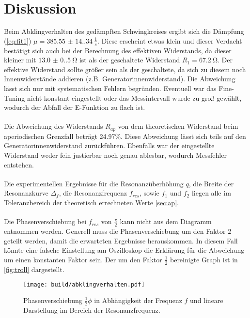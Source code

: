 \section{Diskussion}
\label{sec:Diskussion}
Beim Abklingverhalten des gedämpften Schwingkreises ergibt sich die Dämpfung (\autoref{eq:fit1}) 
$\mu = \SI{385.55(14.34)}{\frac{1}{s}}$. Diese erscheint etwas klein und dieser Verdacht
bestätigt sich auch bei der Berechnung des effektiven Widerstands, da dieser kleiner mit
$\SI{13.0(0.5)}{\ohm}$ ist als der geschaltete Widerstand $R_1 = \SI{67.2}{\ohm}$.
Der effektive Widerstand sollte größer sein als der geschaltete, da sich zu diesem noch
Innenwiderstände addieren (z.B. Generatorinnenwiderstand). Die Abweichung lässt sich nur mit
systematischen Fehlern begründen. Eventuell war das Fine-Tuning nicht konstant eingestellt
oder das Messintervall wurde zu groß gewählt, wodurch der Abfall der E-Funktion zu flach ist.
\\
\\
Die Abweichung des Widerstands $R_{ap}$ von dem theoretischen Widerstand beim aperiodischen
Grenzfall beträgt 24.97\%. Diese Abweichung lässt sich teils auf den Generatorinnenwiderstand
zurückführen. Ebenfalls war der eingestellte Widerstand weder fein justierbar noch genau ablesbar, 
wodurch Messfehler entstehen.
\\
\\
Die experimentellen Ergebnisse für die Resonanzüberhöhung $q$, die Breite der Resonanzkurve 
$\Delta_f$, die Resonanzfrequenz $f_{res}$, sowie $f_1$ und $f_2$ liegen alle im Toleranzbereich
der theoretisch errechneten Werte \autoref{sec:ap}.
\\
\\
Die Phasenverschiebung bei $f_{res}$ von $\frac{\pi}{2}$ kann nicht aus dem Diagramm entnommen werden.
Generell muss die Phasenverschiebung um den Faktor 2 geteilt werden, damit die erwarteten 
Ergebnisse herauskommen. In diesem Fall könnte eine falsche Einstellung am Oszilloskop
die Erklärung für die Abweichung um einen konstanten Faktor sein.
Der um den Faktor $\frac{1}{2}$ bereinigte Graph ist in \autoref{fig:troll} dargestellt.
\begin{figure}[H]
    \texttt{[image: build/abklingverhalten.pdf]}
    \caption{Phasenverschiebung $\frac{1}{2}\phi$ in Abhängigkeit der Frequenz $f$ und lineare Darstellung im Bereich der Resonanzfrequenz.}
    \label{fig:troll}
  \end{figure}